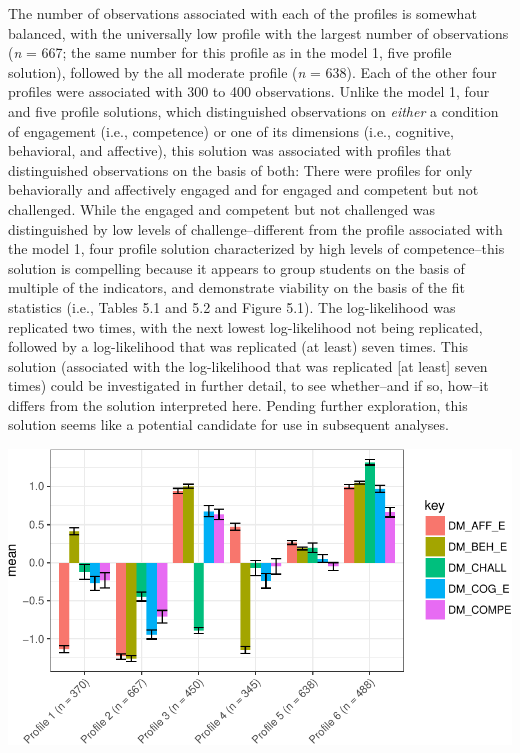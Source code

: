 \documentclass[]{msu-thesis}
\theoremstyle{definition}
\theoremstyle{definition}
\theoremstyle{definition}
\theoremstyle{remark}
\begin{document}
The number of observations associated with each of the profiles is
somewhat balanced, with the universally low profile with the largest
number of observations (\emph{n} = 667; the same number for this profile
as in the model 1, five profile solution), followed by the all moderate
profile (\emph{n} = 638). Each of the other four profiles were
associated with 300 to 400 observations. Unlike the model 1, four and
five profile solutions, which distinguished observations on
\emph{either} a condition of engagement (i.e., competence) or one of its
dimensions (i.e., cognitive, behavioral, and affective), this solution
was associated with profiles that distinguished observations on the
basis of both: There were profiles for only behaviorally and affectively
engaged and for engaged and competent but not challenged. While the
engaged and competent but not challenged was distinguished by low levels
of challenge--different from the profile associated with the model 1,
four profile solution characterized by high levels of competence--this
solution is compelling because it appears to group students on the basis
of multiple of the indicators, and demonstrate viability on the basis of
the fit statistics (i.e., Tables 5.1 and 5.2 and Figure 5.1). The
log-likelihood was replicated two times, with the next lowest
log-likelihood not being replicated, followed by a log-likelihood that
was replicated (at least) seven times. This solution (associated with
the log-likelihood that was replicated {[}at least{]} seven times) could
be investigated in further detail, to see whether--and if so, how--it
differs from the solution interpreted here. Pending further exploration,
this solution seems like a potential candidate for use in subsequent
analyses.

\begin{center}\includegraphics[width=0.8\linewidth]{rosenberg-dissertation_files/figure-latex/m1_6p-1} \end{center}
\end{document}
